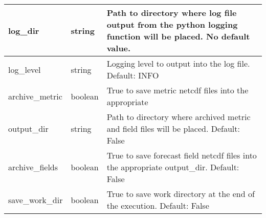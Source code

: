 \documentclass[psfig,12pt]{article}
\begin{document}
\begin{table}[H]
\begin{center}
\begin{tabular}{|p{1.60in}|p{0.5in}|p{4.15in}|}
log\_dir & string & Path to directory where log file output from the python logging function
will be placed.  No default value. \\ \hline

log\_level & string & Logging level to output into the log file.  Default: INFO \\ \hline

archive\_metric & boolean & True to save metric netcdf files into the appropriate \\ \hline

output\_dir & string & Path to directory where archived metric and field files will be 
placed.  Default: False \\ \hline

archive\_fields & boolean & True to save forecast field netcdf files into the appropriate
output\_dir.  Default: False \\ \hline

save\_work\_dir & boolean & True to save work directory at the end of the execution.
Default:  False \\ \hline

\end{tabular}
\end{center}
\end{table}
\end{document}
